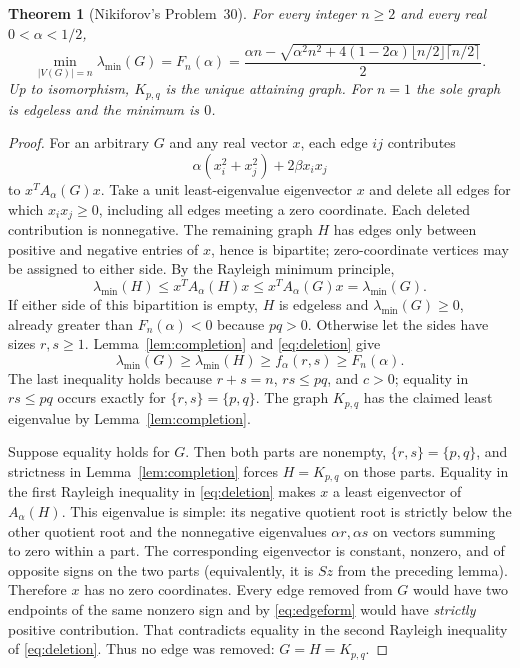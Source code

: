 \documentclass[11pt]{amsart}
\newtheorem{theorem}{Theorem}[section]
\theoremstyle{definition}
\newcommand{\Aa}{A_{\alpha}}
\newcommand{\lam}{\lambda_{\min}}
\begin{document}
\begin{theorem}[Nikiforov's Problem~30]\label{thm:main}
For every integer $n\ge2$ and every real $0<\alpha<1/2$,
\begin{equation}\label{eq:minimum}
 \min_{|V(G)|=n}\lam(G)=F_n(\alpha)
 =\frac{\alpha n-\sqrt{\alpha^2n^2+4(1-2\alpha)\lfloor n/2\rfloor\lceil n/2\rceil}}2.
\end{equation}
Up to isomorphism, $K_{p,q}$ is the unique attaining graph. For $n=1$ the sole graph is edgeless and the minimum is $0$.
\end{theorem}
\begin{proof}
For an arbitrary $G$ and any real vector $x$, each edge $ij$ contributes
\begin{equation}\label{eq:edgeform}
 \alpha(x_i^2+x_j^2)+2\beta x_ix_j
\end{equation}
to $x^T\Aa(G)x$. Take a unit least-eigenvalue eigenvector $x$ and delete all edges for which $x_ix_j\ge0$, including all edges meeting a zero coordinate. Each deleted contribution is nonnegative. The remaining graph $H$ has edges only between positive and negative entries of $x$, hence is bipartite; zero-coordinate vertices may be assigned to either side. By the Rayleigh minimum principle,
\begin{equation}\label{eq:deletion}
 \lam(H)\le x^T\Aa(H)x\le x^T\Aa(G)x=\lam(G).
\end{equation}
If either side of this bipartition is empty, $H$ is edgeless and $\lam(G)\ge0$, already greater than $F_n(\alpha)<0$ because $pq>0$. Otherwise let the sides have sizes $r,s\ge1$. Lemma~\ref{lem:completion} and \eqref{eq:deletion} give
\[
 \lam(G)\ge\lam(H)\ge f_\alpha(r,s)\ge F_n(\alpha).
\]
The last inequality holds because $r+s=n$, $rs\le pq$, and $c>0$; equality in $rs\le pq$ occurs exactly for $\{r,s\}=\{p,q\}$. The graph $K_{p,q}$ has the claimed least eigenvalue by Lemma~\ref{lem:completion}.

Suppose equality holds for $G$. Then both parts are nonempty, $\{r,s\}=\{p,q\}$, and strictness in Lemma~\ref{lem:completion} forces $H=K_{p,q}$ on those parts. Equality in the first Rayleigh inequality in \eqref{eq:deletion} makes $x$ a least eigenvector of $\Aa(H)$. This eigenvalue is simple: its negative quotient root is strictly below the other quotient root and the nonnegative eigenvalues $\alpha r,\alpha s$ on vectors summing to zero within a part. The corresponding eigenvector is constant, nonzero, and of opposite signs on the two parts (equivalently, it is $Sz$ from the preceding lemma). Therefore $x$ has no zero coordinates. Every edge removed from $G$ would have two endpoints of the same nonzero sign and by \eqref{eq:edgeform} would have \emph{strictly} positive contribution. That contradicts equality in the second Rayleigh inequality of \eqref{eq:deletion}. Thus no edge was removed: $G=H=K_{p,q}$.
\end{proof}
\end{document}
